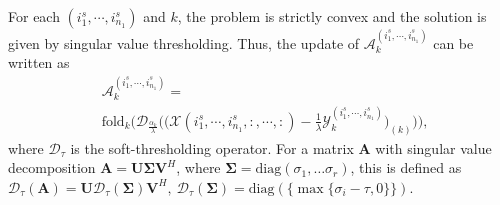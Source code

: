 \documentclass[12pt, draftcls, onecolumn]{IEEEtran}
\theoremstyle{plain}
\theoremstyle{definition}
\theoremstyle{remark}
\begin{document}
For each $(i^s_{1},\cdots,i^s_{n_1})$ and $k$, the problem is strictly convex \cite{Cai_asingular} and the solution is given by singular value thresholding.
Thus, the update of $\mathcal{A}^{(i^s_{1},\cdots,i^s_{n_1})}_k$ can be written as
\begin{align}
\label{update_A_noisefree}
        &\mathcal{A}^{(i^s_{1},\cdots,i^s_{n_1})}_k=\\
        &\text{fold}_k\Big(\mathcal{D}_{\frac{\alpha_k}{\lambda}}\bigg(\Big(\mathcal{X}(i^s_{1},\cdots,i^s_{n_1},:,\cdots,:)-\frac{1}{\lambda}\mathcal{Y}^{(i^s_{1},\cdots,i^s_{n_1})}_k\Big)_{(k)}\bigg)\Big),%
        \nonumber
\end{align}
where $\mathcal{D}_\tau$ is the soft-thresholding operator.
For a matrix $\mathbf A$ with singular value decomposition $\mathbf{A}=\mathbf{U}\mathbf{\Sigma}\mathbf{V}^H$,
where $\mathbf{\Sigma}=\text{diag}(\sigma_1,\dots\sigma_r)$, this is defined as
$\mathcal{D}_\tau(\mathbf{A})=\mathbf{U}\mathcal{D}_\tau(\mathbf{\Sigma})\mathbf{V}^H,\ \mathcal{D}_\tau(\mathbf{\Sigma})=\text{diag}(\{\max\{\sigma_i-\tau,0\}\}).$
\end{document}
